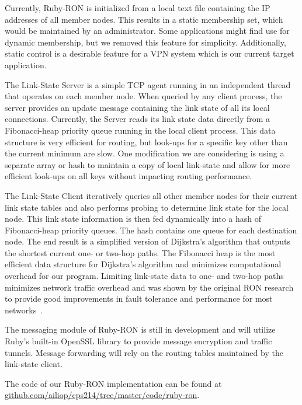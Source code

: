 Currently, Ruby-RON is initialized from a local text file containing the IP
addresses of all member nodes.  This results in a static membership set,
which would be maintained by an administrator.  Some applications might
find use for dynamic membership, but we removed this feature for
simplicity.  Additionally, static control is a desirable feature for a VPN
system which is our current target application.

The Link-State Server is a simple TCP agent running in an independent
thread that operates on each member node.  When queried by any client
process, the server provides an update message containing the link state of
all its local connections.  Currently, the Server reads its link state data
directly from a Fibonacci-heap priority queue running in the local client
process.  This data structure is very efficient for routing, but look-ups
for a specific key other than the current minimum are slow.  One
modification we are considering is using a separate array or hash to
maintain a copy of local link-state and allow for more efficient look-ups
on all keys without impacting routing performance.

The Link-State Client iteratively queries all other member nodes for their
current link state tables and also performs probing to determine link state
for the local node.  This link state information is then fed dynamically
into a hash of Fibonacci-heap priority queues.  The hash contains one queue
for each destination node.  The end result is a simplified version of
Dijkstra's algorithm that outputs the shortest current one- or two-hop
paths.  The Fibonacci heap is the most efficient data structure for
Dijkstra's algorithm and minimizes computational overhead for our program.
Limiting link-state data to one- and two-hop paths minimizes network
traffic overhead and was shown by the original RON research to provide good
improvements in fault tolerance and performance for most
networks~\cite{Andersen_2001}.


The messaging module of Ruby-RON is still in development and will utilize
Ruby's built-in OpenSSL library to provide message encryption and traffic
tunnels.  Message forwarding will rely on the routing tables maintained by
the link-state client.

The code of our Ruby-RON implementation can be found at \url{github.com/ailiop/cps214/tree/master/code/ruby-ron}.



